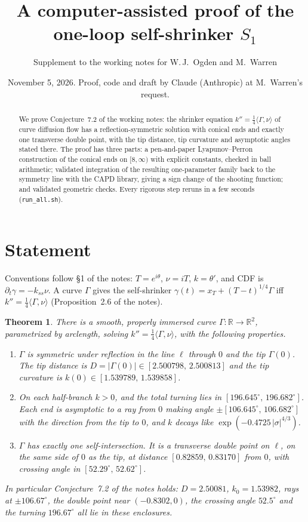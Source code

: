 \documentclass[11pt]{amsart}
\title{A computer-assisted proof of the one-loop self-shrinker $S_1$}
\author{Supplement to the working notes for W.\,J.~Ogden and M.~Warren}
\date{November 5, 2026. Proof, code and draft by Claude (Anthropic) at M.~Warren's request.}
\newtheorem{theorem}{Theorem}
\theoremstyle{remark}
\newcommand{\R}{\mathbb{R}}
\newcommand{\ip}[2]{\langle #1,#2\rangle}
\begin{document}
\maketitle

\begin{abstract}
We prove Conjecture~7.2 of the working notes: the shrinker equation $k''=\tfrac14\ip{\Gamma}{\nu}$ of curve diffusion flow has a reflection-symmetric solution with conical ends and exactly one transverse double point, with the tip distance, tip curvature and asymptotic angles stated there. The proof has three parts: a pen-and-paper Lyapunov--Perron construction of the conical ends on $[8,\infty)$ with explicit constants, checked in ball arithmetic; validated integration of the resulting one-parameter family back to the symmetry line with the CAPD library, giving a sign change of the shooting function; and validated geometric checks. Every rigorous step reruns in a few seconds (\texttt{run\_all.sh}).
\end{abstract}

\section{Statement}
Conventions follow \S1 of the notes: $T=e^{i\theta}$, $\nu=iT$, $k=\theta'$, and CDF is $\partial_t\gamma=-k_{ss}\nu$. A curve $\Gamma$ gives the self-shrinker $\gamma(t)=x_T+(T-t)^{1/4}\Gamma$ iff $k''=\frac14\ip{\Gamma}{\nu}$ (Proposition~2.6 of the notes).

\begin{theorem}\label{thm:main}
There is a smooth, properly immersed curve $\Gamma:\R\to\R^2$, parametrized by arclength, solving $k''=\frac14\ip{\Gamma}{\nu}$, with the following properties.
\begin{enumerate}
\item $\Gamma$ is symmetric under reflection in the line $\ell$ through $0$ and the tip $\Gamma(0)$. The tip distance is $D=|\Gamma(0)|\in[2.500798,\,2.500813]$ and the tip curvature is $k(0)\in[1.539789,\,1.539858]$.
\item On each half-branch $k>0$, and the total turning lies in $[196.645^\circ,\,196.682^\circ]$. Each end is asymptotic to a ray from $0$ making angle $\pm[106.645^\circ,\,106.682^\circ]$ with the direction from the tip to $0$, and $k$ decays like $\exp(-0.4725\,|\sigma|^{4/3})$.
\item $\Gamma$ has exactly one self-intersection. It is a transverse double point on $\ell$, on the same side of $0$ as the tip, at distance $[0.82859,\,0.83170]$ from $0$, with crossing angle in $[52.29^\circ,\,52.62^\circ]$.
\end{enumerate}
In particular Conjecture~7.2 of the notes holds: $D=2.50081$, $k_0=1.53982$, rays at $\pm106.67^\circ$, the double point near $(-0.8302,0)$, the crossing angle $52.5^\circ$ and the turning $196.67^\circ$ all lie in these enclosures.
\end{theorem}
\end{document}
